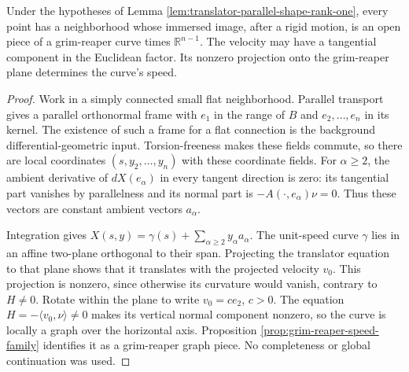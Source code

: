 \begin{proposition}\label{prop:translator-local-grim-product}
Under the hypotheses of Lemma \ref{lem:translator-parallel-shape-rank-one}, every point has a neighborhood whose immersed image, after a rigid motion, is an open piece of a grim-reaper curve times $\mathbb R^{n-1}$. The velocity may have a tangential component in the Euclidean factor. Its nonzero projection onto the grim-reaper plane determines the curve's speed.
\end{proposition}
\begin{proof}
Work in a simply connected small flat neighborhood. Parallel transport gives a parallel orthonormal frame with $e_1$ in the range of $B$ and $e_2,\ldots,e_n$ in its kernel. The existence of such a frame for a flat connection is the background differential-geometric input. Torsion-freeness makes these fields commute, so there are local coordinates $(s,y_2,\ldots,y_n)$ with these coordinate fields. For $\alpha\ge2$, the ambient derivative of $dX(e_\alpha)$ in every tangent direction is zero: its tangential part vanishes by parallelness and its normal part is $-A(\cdot,e_\alpha)\nu=0$. Thus these vectors are constant ambient vectors $a_\alpha$.

Integration gives $X(s,y)=\gamma(s)+\sum_{\alpha\ge2}y_\alpha a_\alpha$. The unit-speed curve $\gamma$ lies in an affine two-plane orthogonal to their span. Projecting the translator equation to that plane shows that it translates with the projected velocity $v_0$. This projection is nonzero, since otherwise its curvature would vanish, contrary to $H\ne0$. Rotate within the plane to write $v_0=ce_2$, $c>0$. The equation $H=-\langle v_0,\nu\rangle\ne0$ makes its vertical normal component nonzero, so the curve is locally a graph over the horizontal axis. Proposition \ref{prop:grim-reaper-speed-family} identifies it as a grim-reaper graph piece. No completeness or global continuation was used.
\end{proof}

